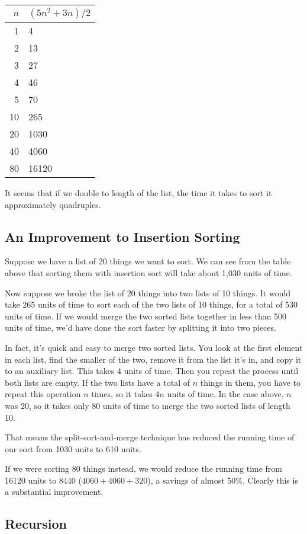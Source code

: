 \begin{tabular}{r|l}
$n$ & $(5n^2+3n)/ 2$ \\ \hline
1   & 4 \\
2   & 13 \\
3   & 27 \\
4   & 46 \\
5   & 70 \\
10  & 265 \\
20  & 1030 \\
40  & 4060 \\
80  & 16120 
\end{tabular}

It seems that if we double to length of the list, the time it takes to
sort it approximately quadruples.

\subsection{An Improvement to Insertion Sorting}

Suppose we have a list of 20 things we want to sort.  We can see from
the table above that sorting them with insertion sort will take about
1,030 units of time.

Now suppose we broke the list of 20 things into two lists of 10 things.
It would take 265 units of time to sort each of the two lists of 10
things, for a total of 530 units of time.  If we would merge the two
sorted lists together in less than 500 units of time, we'd have
done the sort faster by splitting it into two pieces.

In fact, it's quick and easy to merge two sorted lists.  You look at the
first element in each list, find the smaller of the two, remove it from
the list it's in, and copy it to an auxiliary list.  This takes 4 units
of time.  Then you repeat the process until both lists are empty.  If
the two lists have a total of $n$ things in them, you have to repeat
this operation $n$ times, so it takes $4n$ units of time.  In the case
above, $n$ was 20, so it takes only 80 units of time to merge the two
sorted lists of length 10.  

That means the split-sort-and-merge technique has reduced the running
time of our sort from 1030 units to 610 units.  

If we were sorting 80 things instead, we would reduce the running time
from 16120 units to 8440 ($4060+4060+320$), a savings of almost 50\%.
Clearly this is a substantial improvement.

\subsection{Recursion}

